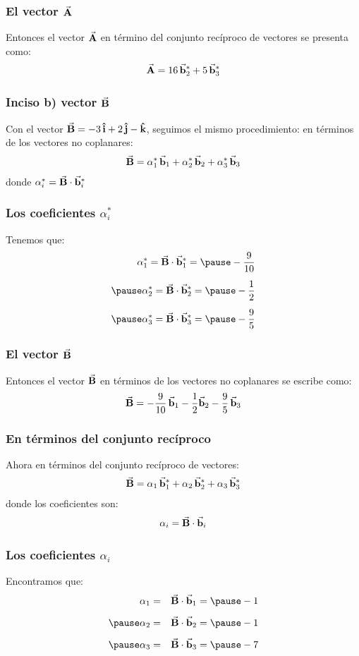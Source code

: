 \documentclass[12pt]{beamer}
\begin{document}
\begin{frame}
\frametitle{El vector $\va{A}$}
Entonces el vector $\va{A}$ en término del conjunto recíproco de vectores se presenta como:
\pause
\begin{align*}
\va{A} = 16 \, \va{b}_{2}^{*} + 5 \, \va{b}_{3}^{*}
\end{align*}
\end{frame}
\begin{frame}
\frametitle{Inciso b) vector $\va{B}$ }
Con el vector $\va{B} = -3 \, \vu{i} +2 \, \vu{j} - \vu{k}$, seguimos el mismo procedimiento: \pause en términos de los vectores no coplanares: \pause
\begin{align*}
\va{B} = \alpha_{1}^{*} \, \va{b}_{1} + \alpha_{2}^{*} \, \va{b}_{2} + \alpha_{3}^{*} \, \va{b}_{3}
\end{align*}
\pause
donde $\alpha_{i}^{*} = \va{B} \cdot \va{b}_{i}^{*}$
\end{frame}
\begin{frame}
\frametitle{Los coeficientes $\alpha_{i}^{*}$}
Tenemos que:
\begin{eqnarray*}
\alpha_{1}^{*} = \va{B} \cdot \va{b}_{1}^{*} = \pause - \dfrac{9}{10} \\[0.5em] \pause
\alpha_{2}^{*} = \va{B} \cdot \va{b}_{2}^{*} = \pause - \dfrac{1}{2} \\[0.5em] \pause
\alpha_{3}^{*} = \va{B} \cdot \va{b}_{3}^{*} = \pause - \dfrac{9}{5}
\end{eqnarray*}
\end{frame}
\begin{frame}
\frametitle{El vector $\va{B}$}
Entonces el vector $\va{B}$ en términos de los vectores no coplanares se escribe como:
\begin{align*}
\va{B} = - \dfrac{9}{10} \, \va{b}_{1} - \dfrac{1}{2} \va{b}_{2} -\dfrac{9}{5} \, \va{b}_{3}
\end{align*}
\end{frame}
\begin{frame}
\frametitle{En términos del conjunto recíproco}
Ahora en términos del conjunto recíproco de vectores:
\begin{align*}
\va{B} = \alpha_{1} \, \va{b}_{1}^{*} + \alpha_{2} \, \va{b}_{2}^{*} + \alpha_{3} \, \va{b}_{3}^{*}
\end{align*}
\pause
donde los coeficientes son:
\begin{align*}
\alpha_{i} = \va{B} \cdot \va{b}_{i}
\end{align*}
\end{frame}
\begin{frame}
\frametitle{Los coeficientes $\alpha_{i}$}
Encontramos que:
\begin{eqnarray*}
\alpha_{1} &=& \va{B} \cdot \va{b}_{1} = \pause -1 \\[0.5em] \pause
\alpha_{2} &=& \va{B} \cdot \va{b}_{2} = \pause -1 \\[0.5em] \pause
\alpha_{3} &=& \va{B} \cdot \va{b}_{3} = \pause -7
\end{eqnarray*}
\end{frame}
\end{document}
